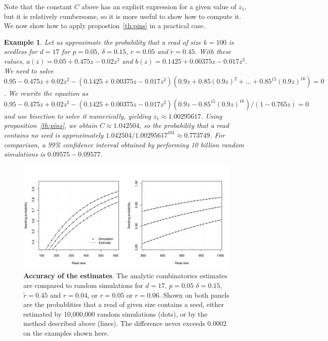 \documentclass{article}
\newtheorem{example}{Example}
\begin{document}
Note that the constant $C$ above has an explicit expression for a given
value of $z_1$, but it is relatively cumbersome, so it is more useful to
show how to compute it. We now show how to apply propostion~\ref{th:pins} in a
practical case.

\begin{example}
\label{ex:num3}
Let us approximate the probability that a read of size $k=100$ is seedless
for $d=17$ for $p=0.05$, $\delta=0.15$, $r=0.05$ and $\tilde{r}=0.45$.
With these values, $a(z) = 0.05 +0.475z -0.02z^2$ and $b(z) = 0.1425 +
0.00375z-0.017z^2$. We need to solve $0.95-0.475z+0.02z^2 - (0.1425
+0.00375z-0.017z^2)(0.9z+0.85(0.9z)^2+\ldots+0.85^{15}(0.9z)^{16}) = 0$.
We rewrite the equation as $0.95-0.475z+0.02z^2 - (0.1425
+0.00375z-0.017z^2)(0.9z-0.85^{15}(0.9z)^{16})/(1-0.765z) = 0$ and use
bisection to solve it numerically, yielding $z_1 \approx 1.00295617$.
Using proposition~\ref{th:pins}, we obtain $C \approx 1.042504$, so the
probability that a read contains no seed is approximately $1.042504 /
1.00295617^{101} \approx 0.773749$. For comparison, a 99\% confidence
interval obtained by performing 10 billion random simulations is
$0.09575-0.09577$.
\end{example}

\begin{figure}[h]
\centering
\includegraphics[scale=0.445]{simulpins.pdf}
\caption{\textbf{Accuracy of the estimates}. The analytic combinatorics
estimates are compared to random simulations for $d=17$, $p=0.05$ 
$\delta=0.15$, $\tilde{r} = 0.45$ and $r = 0.04$, or $r = 0.05$ or $r =
0.06$. Shown on both panels are the probablities that a read of given size
contains a seed, either estimated by 10,000,000 random simulations (dots),
or by the method described above (lines). The difference never exceeds
0.0002 on the examples shown here.}
\label{fig:simulpins}
\end{figure}
\end{document}
